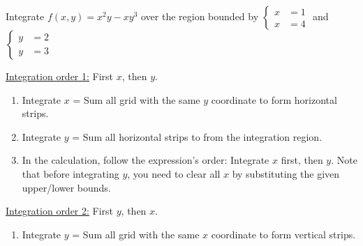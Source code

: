 \documentclass[class=article, crop=false, 12pt]{standalone}
\begin{document}
\begin{example}
    Integrate $f(x,y) = x^2y-xy^3$ over the region bounded by 
    $\begin{cases}x&=1\\x&=4\end{cases}$ and $\begin{cases}y&=2\\y&=3\end{cases}$


    \ul{Integration order 1:} First $x$, then $y$.
    \begin{enumerate}
        \item Integrate $x$ = Sum all grid with the same $y$ coordinate to form horizontal strips.
        
        \item Integrate $y$ = Sum all horizontal strips to from the integration region.

        \item In the calculation, follow the expression's order: Integrate $x$ first, then $y$. 
        Note that before integrating $y$, you need to clear all $x$ by substituting the given upper/lower bounds.
    \end{enumerate}

    \ul{Integration order 2:} First $y$, then $x$.
    \begin{enumerate}
        \item Integrate $y$ = Sum all grid with the same $x$ coordinate to form vertical strips.
        

\end{enumerate}
\end{example}
\end{document}
